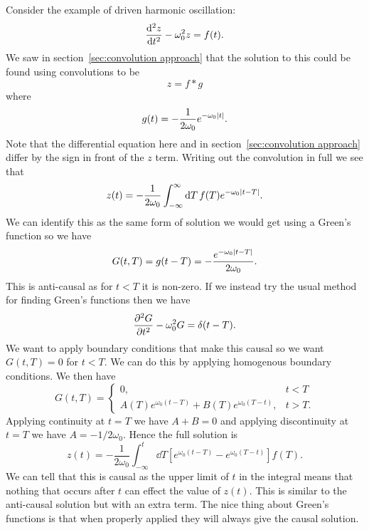 \documentclass[a4paper]{article}
\newcommand{\convolution}{\mathbin{*}}
\begin{document}
    Consider the example of driven harmonic oscillation:
    \[\dv[2]{z}{t} - \omega_0^2 z = f(t).\]
    We saw in section~\ref{sec:convolution approach} that the solution to this could be found using convolutions to be
    \[z = f\convolution g\]
    where
    \[g(t) = -\frac{1}{2\omega_0}e^{-\omega_0\abs{t}}.\]
    Note that the differential equation here and in section~\ref{sec:convolution approach} differ by the sign in front of the \(z\) term.
    Writing out the convolution in full we see that
    \[z(t) = -\frac{1}{2\omega_0}\int_{-\infty}^{\infty} \dd{T} f(T) e^{-\omega_0\abs{t - T}}.\]
    We can identify this as the same form of solution we would get using a Green's function so we have
    \[G(t, T) = g(t - T) = -\frac{e^{-\omega_0\abs{t - T}}}{2\omega_0}.\]
    This is anti-causal as for \(t < T\) it is non-zero.
    If we instead try the usual method for finding Green's functions then we have
    \[\pdv[2]{G}{t} - \omega_0^2G = \delta(t - T).\]
    We want to apply boundary conditions that make this causal so we want \(G(t, T) = 0\) for \(t < T\).
    We can do this by applying homogenous boundary conditions.
    We then have
    \[
        G(t, T) =
        \begin{cases}
            0, & t < T\\
            A(T)e^{\omega_0(t - T)} + B(T)e^{\omega_0(T - t)}, & t > T.
        \end{cases}
    \]
    Applying continuity at \(t = T\) we have \(A + B = 0\) and applying discontinuity at \(t = T\) we have \(A = -1/2\omega_0\).
    Hence the full solution is
    \[z(t) = -\frac{1}{2\omega_0}\int_{-\infty}^{t} \dd{T}\left[e^{\omega_0(t - T)} - e^{\omega_0(T - t)}\right]f(T).\]
    We can tell that this is causal as the upper limit of \(t\) in the integral means that nothing that occurs after \(t\) can effect the value of \(z(t)\).
    This is similar to the anti-causal solution but with an extra term.
    The nice thing about Green's functions is that when properly applied they will always give the causal solution.
    
\end{document}

